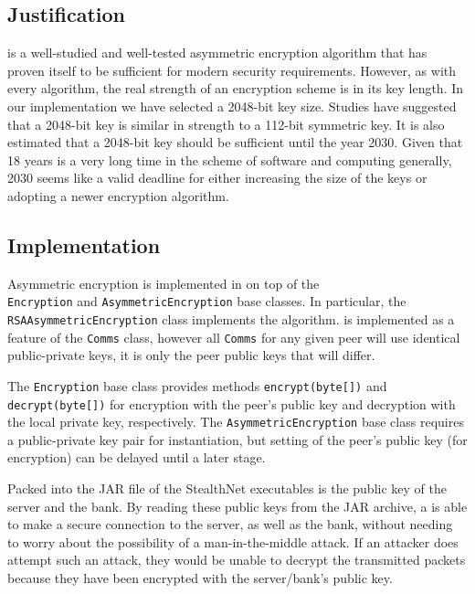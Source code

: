 \documentclass[a4paper,11pt]{article}
\begin{document}
\subsection{Justification}
 is a well-studied and well-tested asymmetric encryption
algorithm that has proven itself to be sufficient for modern security
requirements. However, as with every algorithm, the real strength of an
encryption scheme is in its key length. In our implementation we have selected a
2048-bit key size. Studies have suggested that a 2048-bit  key is
similar in strength to a 112-bit symmetric key. It is also estimated that a
2048-bit key should be sufficient until the year 2030. Given that 18 years is a
very long time in the scheme of software and computing generally, 2030 seems
like a valid deadline for either increasing the size of the  keys
or adopting a newer encryption algorithm.

\subsection{Implementation}
Asymmetric encryption is implemented in \packageName{} on top of the \\
\verb+Encryption+ and \verb+AsymmetricEncryption+ base classes. In particular,
the \\ \verb+RSAAsymmetricEncryption+ class implements the 
algorithm.  is implemented as a feature of the
\serviceName{} \verb+Comms+ class, however all \verb+Comms+ for any given
\serviceName{} peer will use identical public-private keys, it is only the peer
public keys that will differ.

The \verb+Encryption+ base class provides methods \verb+encrypt(byte[])+ and
\verb+decrypt(byte[])+ for encryption with the peer's public key and decryption
with the local private key, respectively.  The \verb+AsymmetricEncryption+ base
class requires a public-private key pair for instantiation, but setting of the
peer's public key (for encryption) can be delayed until a later stage.

Packed into the JAR file of the StealthNet executables is the public key of the
\serviceName{} server and the \serviceName{} bank. By reading these public keys
from the JAR archive, a \serviceName{} is able to make a secure connection to
the \serviceName{} server, as well as the \serviceName{} bank, without needing
to worry about the possibility of a man-in-the-middle attack. If an attacker
does attempt such an attack, they would be unable to decrypt the transmitted
packets because they have been encrypted with the server/bank's public key.
\end{document}
